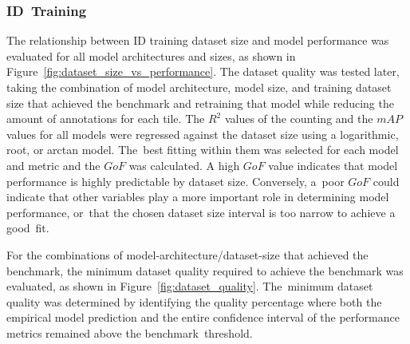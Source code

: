 \documentclass[12pt,a4paper,oneside]{report}
\begin{document}
\vspace{-9pt}

\subsubsection{ID~Training}

The relationship between ID training dataset size and model performance was evaluated 
for all model architectures and sizes, as shown in Figure~\ref{fig:dataset_size_vs_performance}. 
The dataset quality was tested later, taking the combination of model architecture, model size, and
training dataset size that achieved the benchmark and retraining that model while reducing the amount of
annotations for each tile. 
The $R^2$ values of the counting and the $mAP$ values for all models were regressed 
against the dataset size using a logarithmic, root, or arctan model. The~best fitting
within them was selected for each model and metric and the $GoF$ was calculated.
A high $GoF$ value indicates that model performance is highly predictable by dataset size. 
Conversely, a~poor $GoF$ could indicate that other variables play a more important 
role in determining model performance, or~that the chosen dataset size interval is 
too narrow to achieve a good~fit.

For the combinations of model-architecture/dataset-size that achieved the benchmark,
the minimum dataset quality required to achieve the benchmark was evaluated, as
shown in Figure~\ref{fig:dataset_quality}. The~minimum dataset quality was determined by identifying 
the quality percentage where both the empirical model prediction and the entire confidence interval 
of the performance metrics remained above the benchmark~threshold.
\end{document}
